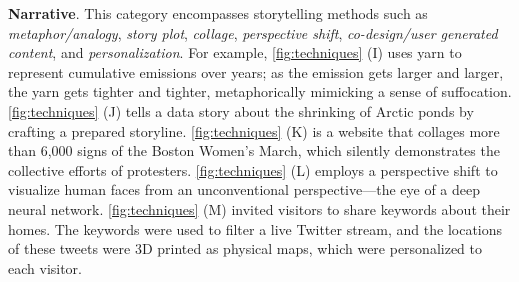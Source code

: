 \textbf{Narrative}. This category encompasses storytelling methods such as \textit{metaphor/analogy}, \textit{story plot}, \textit{collage}, \textit{perspective shift}, \textit{co-design/user generated content}, and \textit{personalization}. 
For example, 
\autoref{fig:techniques} (I) uses yarn to represent cumulative emissions over years; as the emission gets larger and larger, the yarn gets tighter and tighter, metaphorically mimicking a sense of suffocation.
\autoref{fig:techniques} (J) tells a data story about the shrinking of Arctic ponds by crafting a prepared storyline.
\autoref{fig:techniques} (K) is a website that collages more than 6,000 signs of the Boston Women’s March, which silently demonstrates the collective efforts of protesters. 
\autoref{fig:techniques} (L) employs a perspective shift to visualize human faces from an unconventional perspective—the eye of a deep neural network.
\autoref{fig:techniques} (M) invited visitors to share keywords about their homes. The keywords were used to filter a live Twitter stream, and the locations of these tweets were 3D printed as physical maps, which were personalized to each visitor.



